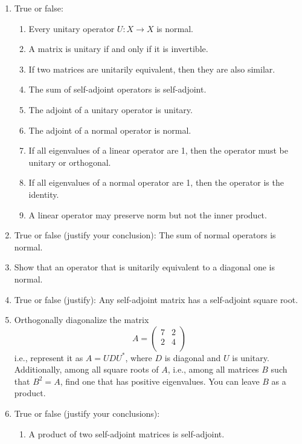 \documentclass[../psets.tex]{subfiles}
\begin{document}
\begin{enumerate}[label={\textbf{2.\arabic*.}}]
    \item True or false:
    \begin{enumerate}
        \item Every unitary operator $U:X\to X$ is normal.
        \item A matrix is unitary if and only if it is invertible.
        \item If two matrices are unitarily equivalent, then they are also similar.
        \item The sum of self-adjoint operators is self-adjoint.
        \item The adjoint of a unitary operator is unitary.
        \item The adjoint of a normal operator is normal.
        \item If all eigenvalues of a linear operator are 1, then the operator must be unitary or orthogonal.
        \item If all eigenvalues of a normal operator are 1, then the operator is the identity.
        \item A linear operator may preserve norm but not the inner product.
    \end{enumerate}
    \item True or false (justify your conclusion): The sum of normal operators is normal.
    \item Show that an operator that is unitarily equivalent to a diagonal one is normal.
    \item True or false (justify): Any self-adjoint matrix has a self-adjoint square root.
    \item Orthogonally diagonalize the matrix
    \begin{equation*}
        A =
        \begin{pmatrix}
            7 & 2\\
            2 & 4\\
        \end{pmatrix}
    \end{equation*}
    i.e., represent it as $A=UDU^*$, where $D$ is diagonal and $U$ is unitary. Additionally, among all square roots of $A$, i.e., among all matrices $B$ such that $B^2=A$, find one that has positive eigenvalues. You can leave $B$ as a product.
    \item True or false (justify your conclusions):
    \begin{enumerate}
        \item A product of two self-adjoint matrices is self-adjoint.

\end{enumerate}
\end{enumerate}
\end{document}
